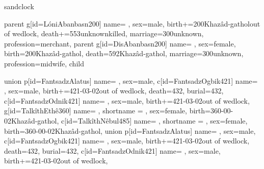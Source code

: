 sandclock
{
    parent{
        g[id=LóniAbanbasn200]{
            name={ },
            sex=male,
            birth+={200}{Khazâd-gathol}{out of wedlock},                  %
            death+={553}{unknown}{killed},
            marriage={300}{unknown},
            profession={merchant},
        }
    }
    parent{
        g[id=DisAbanbasn200]{
            name={ },
            sex=female,
            birth={200}{Khazâd-gathol},
            death={592}{Khazâd-gathol},
            marriage={300}{unknown},
            profession={midwife},
        }
    }
    child{
        union{
            p[id=FantsadzAlatus]{
                name={ },
                sex=male,
            }
            c[id=FantsadzOgbik421]{
                name={ },
                sex=male,           
                birth+={421-03-02}{}{out of wedlock},
                death={432}{},
                burial={432}{},
            }
            c[id=FantsadzOdnik421]{
                name={ },
                sex=male,           
                birth+={421-03-02}{}{out of wedlock},
            }
        }
        g[id=TalkîthEthê360]{
            name={  },
            shortname = { },
            sex=female,
            birth={360-00-02}{Khazâd-gathol},
        }
        c[id=TalkîthNêbul485]{
            name={  },
            shortname = { },
            sex=female,
            birth={360-00-02}{Khazâd-gathol},
        }
        union{
            p[id=FantsadzAlatus]{
                name={ },
                sex=male,
            }
            c[id=FantsadzOgbik421]{
                name={ },
                sex=male,           
                birth+={421-03-02}{}{out of wedlock},
                death={432}{},
                burial={432}{},
            }
            c[id=FantsadzOdnik421]{
                name={ },
                sex=male,           
                birth+={421-03-02}{}{out of wedlock},
            }
        }
        
    }

    
}


